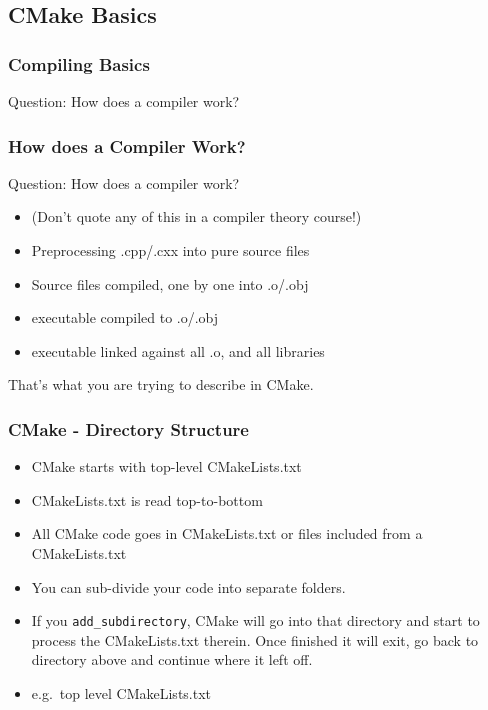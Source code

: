 \subsection{CMake Basics}\label{cmake-basics}

\subsubsection{Compiling Basics}\label{compiling-basics}

Question: How does a compiler work?

\subsubsection{How does a Compiler
Work?}\label{how-does-a-compiler-work}

Question: How does a compiler work?

\begin{itemize}
\itemsep1pt\parskip0pt
\item
  (Don't quote any of this in a compiler theory course!)
\item
  Preprocessing .cpp/.cxx into pure source files
\item
  Source files compiled, one by one into .o/.obj
\item
  executable compiled to .o/.obj
\item
  executable linked against all .o, and all libraries
\end{itemize}

That's what you are trying to describe in CMake.

\subsubsection{CMake - Directory
Structure}\label{cmake---directory-structure}

\begin{itemize}
\itemsep1pt\parskip0pt
\item
  CMake starts with top-level CMakeLists.txt
\item
  CMakeLists.txt is read top-to-bottom
\item
  All CMake code goes in CMakeLists.txt or files included from a
  CMakeLists.txt
\item
  You can sub-divide your code into separate folders.
\item
  If you \texttt{add\_subdirectory}, CMake will go into that directory
  and start to process the CMakeLists.txt therein. Once finished it will
  exit, go back to directory above and continue where it left off.
\item
  e.g.~top level CMakeLists.txt
\end{itemize}

